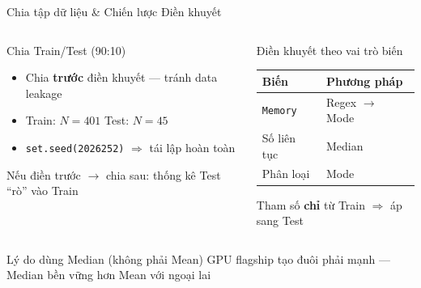 \documentclass[13pt, aspectratio=169]{beamer}
\begin{document}
\begin{frame}{Chia tập dữ liệu \& Chiến lược Điền khuyết}
  \begin{columns}[T]
      \begin{block}{Chia Train/Test (90:10)}
        \footnotesize
        \begin{itemize}
          \item Chia \textbf{trước} điền khuyết --- tránh data leakage
          \item Train: $N=401$ \quad Test: $N=45$
          \item \texttt{set.seed(2026252)} $\Rightarrow$ tái lập hoàn toàn
        \end{itemize}
        \vspace{0.2em}
        {\scriptsize Nếu điền trước $\to$ chia sau: thống kê Test ``rò'' vào Train}
      \end{block}
      \begin{block}{Điền khuyết theo vai trò biến}
        \footnotesize
        \renewcommand{\arraystretch}{1.15}
        \begin{tabular}{ll}
          \toprule
          \textbf{Biến} & \textbf{Phương pháp} \\
          \midrule
          \texttt{Memory} & Regex $\to$ Mode \\
          Số liên tục & Median \\
          Phân loại & Mode \\
          \bottomrule
        \end{tabular}
        \vspace{0.2em}
        {\scriptsize Tham số \textbf{chỉ} từ Train $\Rightarrow$ áp sang Test}
      \end{block}
  \end{columns}
  \vspace{0.3em}
  \begin{alertblock}{\footnotesize Lý do dùng Median (không phải Mean)}
    \footnotesize GPU flagship tạo đuôi phải mạnh --- Median bền vững hơn Mean với ngoại lai
  \end{alertblock}
\end{frame}
\end{document}

